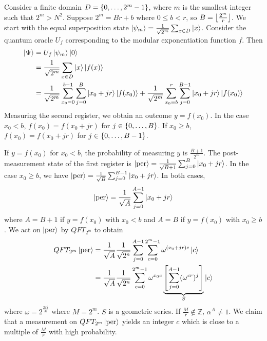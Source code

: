Consider a finite domain \( D = \qty{0, \dots, 2^m - 1} \), where \( m \) is the smallest integer such that \( 2^m > N^2 \).
Suppose \( 2^m = Br + b \) where \( 0 \leq b < r \), so \( B = \floor*{\frac{2^m}{r}} \).
We start with the equal superposition state \( \ket{\psi_m} = \frac{1}{\sqrt{2^m}} \sum_{x \in D} \ket{x} \).
Consider the quantum oracle \( U_f \) corresponding to the modular exponentiation function \( f \).
Then
\begin{align*}
    \ket{\Psi} &= U_f \ket{\psi_m} \ket{0} \\
    &= \frac{1}{\sqrt{2^m}} \sum_{x \in D} \ket{x} \ket{f(x)} \\
    &= \frac{1}{\sqrt{2^m}} \sum_{x_0 = 0}^{b-1} \sum_{j=0}^B \ket{x_0 + jr} \ket{f(x_0)} + \frac{1}{\sqrt{2^m}} \sum_{x_0 = b}^r \sum_{j=0}^{B-1} \ket{x_0 + jr}\ket{f(x_0)}
\end{align*}
Measuring the second register, we obtain an outcome \( y = f(x_0) \).
In the case \( x_0 < b \), \( f(x_0) = f(x_0 + jr) \) for \( j \in \qty{0, \dots, B} \).
If \( x_0 \geq b \), \( f(x_0) = f(x_0 + jr) \) for \( j \in \qty{0, \dots, B - 1} \).

If \( y = f(x_0) \) for \( x_0 < b \), the probability of measuring \( y \) is \( \frac{B+1}{2^m} \).
The post-measurement state of the first register is \( \ket{\mathrm{per}} = \frac{1}{\sqrt{B+1}} \sum_{j=0}^B \ket{x_0 + jr} \).
In the case \( x_0 \geq b \), we have \( \ket{\mathrm{per}} = \frac{1}{\sqrt{B}} \sum_{j=0}^{B-1} \ket{x_0 + jr} \).
In both cases,
\[ \ket{\mathrm{per}} = \frac{1}{\sqrt{A}} \sum_{j=0}^{A-1} \ket{x_0 + jr} \]
where \( A = B+1 \) if \( y = f(x_0) \) with \( x_0 < b \) and \( A = B \) if \( y = f(x_0) \) with \( x_0 \geq b \).
We act on \( \ket{\mathrm{per}} \) by \( QFT_{2^m} \) to obtain
\begin{align*}
    QFT_{2^m} \ket{\mathrm{per}} &= \frac{1}{\sqrt{A}} \frac{1}{\sqrt{2^n}} \sum_{j = 0}^{A-1} \sum_{c=0}^{2^m - 1} \omega^{(x_0 + jr)c}\ket{c} \\
    &=  \frac{1}{\sqrt{A}} \frac{1}{\sqrt{2^n}} \sum_{c=0}^{2^m - 1} \omega^{x_0 c} \underbrace{\qty[\sum_{j = 0}^{A-1} (\omega^{cr})^j]}_{S} \ket{c} \\
\end{align*}
where \( \omega = 2^{\frac{2\pi i}{M}} \) where \( M = 2^m \).
\( S \) is a geometric series.
If \( \frac{M}{r} \not\in \mathbb Z \), \( \alpha^A \neq 1 \).
We claim that a measurement on \( QFT_{2^m} \ket{\mathrm{per}} \) yields an integer \( c \) which is close to a multiple of \( \frac{M}{r} \) with high probability.

